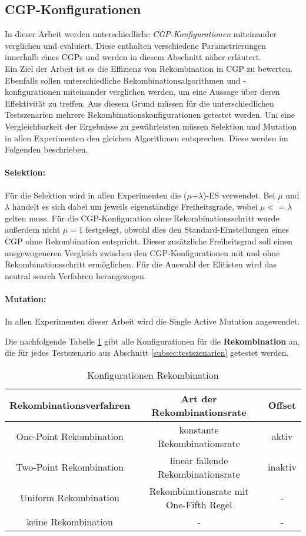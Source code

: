 \subsection{CGP-Konfigurationen}
\label{subsec:CGPkonfigurationen}

In dieser Arbeit werden unterschiedliche \emph{CGP-Konfigurationen} miteinander verglichen und evaluiert. 
Diese enthalten verschiedene Parametrierungen innerhalb eines CGPs und werden in diesem Abschnitt näher erläutert.\\
Ein Ziel der Arbeit ist es die Effizienz von Rekombination in CGP zu bewerten.
Ebenfalls sollen unterschiedliche Rekombinationsalgorithmen und -konfigurationen miteinander verglichen werden, um eine Aussage über deren Effektivität zu treffen.
Aus diesem Grund müssen für die unterschiedlichen Testszenarien mehrere Rekombinationskonfigurationen getestet werden.
Um eine Vergleichbarkeit der Ergebnisse zu gewährleisten müssen Selektion und Mutation in allen Experimenten den gleichen Algorithmen entsprechen.
Diese werden im Folgenden beschrieben.
\paragraph{Selektion:}
Für die Selektion wird in allen Experimenten die ($\mu$+$\lambda$)-ES verwendet.
Bei $\mu$ und $\lambda$ handelt es sich dabei um jeweils eigenständige Freiheitsgrade, wobei $\mu<=\lambda$ gelten muss.
Für die CGP-Konfiguration ohne Rekombinationsschritt wurde außerdem nicht $\mu = 1$ festgelegt, obwohl dies den Standard-Einstellungen eines CGP ohne Rekombination entspricht.
Dieser zusätzliche Freiheitsgrad soll einen ausgewogeneren Vergleich zwischen den CGP-Konfigurationen mit und ohne Rekombinationsschritt ermöglichen.
Für die Auswahl der Elitisten wird das neutral search Verfahren herangezogen.
\paragraph{Mutation:}
In allen Experimenten dieser Arbeit wird die Single Active Mutation angewendet.

Die nachfolgende Tabelle \ref{table:Rekombinationskonfigurationen} gibt alle Konfigurationen für die \textbf{Rekombination} an, die für jedes Testszenario aus Abschnitt \ref{subsec:testszenarien} getestet werden.

\begin{table}[H]
	\centering
	\begin{tabular}{c | c | c}
		\textbf{Rekombinationsverfahren} & \textbf{Art der Rekombinationsrate} & \textbf{Offset}\\
		\hline
		One-Point Rekombination & konstante Rekombinationsrate  & aktiv \\
		\hline
		Two-Point Rekombination & linear fallende Rekombinationsrate & inaktiv \\
		\hline
		Uniform Rekombination & Rekombinationsrate mit One-Fifth Regel & - \\
		\hline
		keine Rekombination &  - &  - \\
	\end{tabular}
	\caption{Konfigurationen Rekombination}
	\label{table:Rekombinationskonfigurationen}
\end{table}

